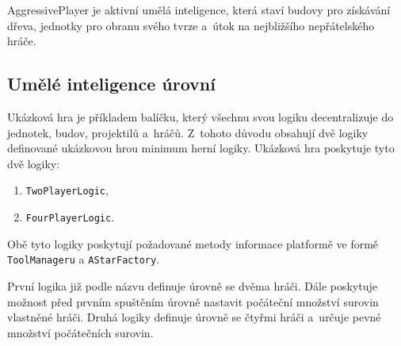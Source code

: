 AggressivePlayer je aktivní umělá inteligence, která staví budovy pro získávání dřeva, jednotky pro obranu svého tvrze a~útok na nejbližšího nepřátelského hráče.

\subsection{Umělé inteligence úrovní}
Ukázková hra je příkladem balíčku, který všechnu svou logiku decentralizuje do jednotek, budov, projektilů a~hráčů. Z~tohoto důvodu obsahují dvě logiky definované ukázkovou hrou minimum herní logiky. Ukázková hra poskytuje tyto dvě logiky:

\begin{enumerate}
	\item \texttt{TwoPlayerLogic},
	\item \texttt{FourPlayerLogic}.
\end{enumerate}

Obě tyto logiky poskytují požadované metody informace platformě ve formě \texttt{ToolManageru} a \texttt{AStarFactory}. 

První logika již podle názvu definuje úrovně se dvěma hráči. Dále poskytuje možnost před prvním spuštěním úrovně nastavit počáteční množství surovin vlastněné hráči.
Druhá logiky definuje úrovně se čtyřmi hráči a~určuje pevné množství počátečních surovin.
